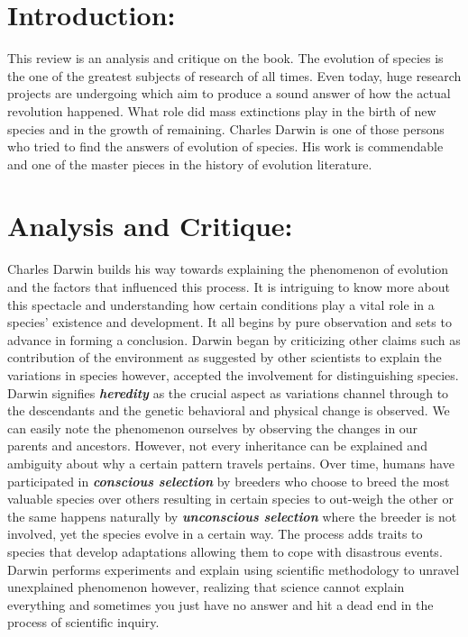\documentclass{article}
\begin{document}
\section*{Introduction:}
	This review is an analysis and critique on the book. The evolution of species is the one of the greatest subjects of research of all times. Even today, huge research projects are undergoing which aim to produce a sound answer of how the actual revolution happened. What role did mass extinctions play in the birth of new species and in the growth of remaining. Charles Darwin is one of those persons who tried to find the answers of evolution of species. His work is commendable and one of the master pieces in the history of evolution literature.

\section*{Analysis and Critique:}
	Charles Darwin builds his way towards explaining the phenomenon of evolution and the factors that influenced this process. It is intriguing to know more about this spectacle and understanding how certain conditions play a vital role in a species' existence and development. It all begins by pure observation and sets to advance in forming a conclusion. Darwin began by criticizing other claims such as contribution of the environment as suggested by other scientists to explain the variations in species however, accepted the involvement for distinguishing species. Darwin signifies \textbf{\textit{heredity}} as the crucial aspect as variations channel through to the descendants and the genetic behavioral and physical change is observed. We can easily note the phenomenon ourselves by observing the changes in our parents and ancestors. However, not every inheritance can be explained and ambiguity about why a certain pattern travels pertains. Over time, humans have participated in \textbf{\textit{conscious selection}} by breeders who choose to breed the most valuable species over others resulting in certain species to out-weigh the other or the same happens naturally by \textbf{\textit{unconscious selection}} where the breeder is not involved, yet the species evolve in a certain way.  The process adds traits to species that develop adaptations allowing them to cope with disastrous events. Darwin performs experiments and explain using scientific methodology to unravel unexplained phenomenon however, realizing that science cannot explain everything and sometimes you just have no answer and hit a dead end in the process of scientific inquiry. \\ \\
\end{document}
